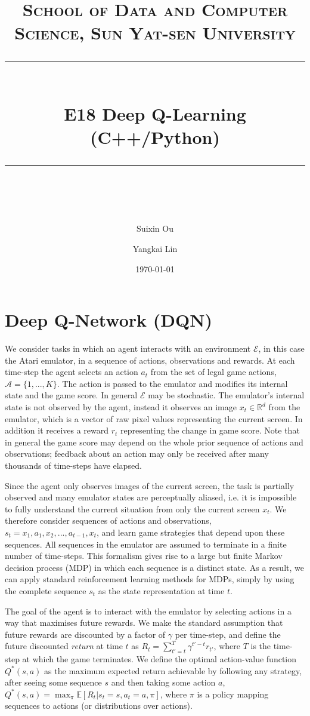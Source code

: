 \documentclass[a4paper, 11pt]{article}
\title{	
\normalfont \normalsize
\textsc{School of Data and Computer Science, Sun Yat-sen University} \\ [25pt] %
\rule{\textwidth}{0.5pt} \\[0.4cm] %
\huge  E18 Deep Q-Learning (C++/Python)\\ %
\rule{\textwidth}{2pt} \\[0.5cm] %
\author{Suixin Ou \and Yangkai Lin}
\date{\normalsize\today}
}
\begin{document}
\maketitle
\tableofcontents
\newpage

\section{Deep Q-Network (DQN) }
We consider tasks in which an agent interacts with an environment $\mathcal{E}$, in this case the Atari emulator, in a sequence of actions, observations and rewards. 
At each time-step the agent selects an action $a_t$ from the set of legal game actions, $\mathcal{A}=\{1, ..., K \}$. The action is passed to the emulator and modifies its internal state and the game score. In general $\mathcal{E}$ may be stochastic. The emulator's internal state is not observed by the agent,  instead it observes an image $x_t\in\mathbb{R}^d$ from the emulator, which is a vector of raw pixel values representing the current screen. In addition it receives a reward $r_t$ representing the change in game score. Note that in general the game score may depend on the whole prior sequence of actions and observations; feedback about an action may only be received after many thousands of time-steps have elapsed. 

Since the agent only observes images of the current screen, the task is partially observed and many emulator states are perceptually aliased, i.e. it is impossible to fully understand the current situation from only the current screen $x_t$. We therefore consider sequences of actions and observations, $s_t = {x_1, a_1, x_2, ..., a_{t-1}, x_t}$, and learn game strategies that depend upon these sequences. All sequences in the emulator are assumed to terminate in a finite number of time-steps. This formalism gives rise to a large but finite Markov decision process (MDP) in which each sequence is a distinct state. As a result, we can apply standard reinforcement learning methods for MDPs, simply by using the complete sequence $s_t$ as the state representation at time $t$.

The goal of the agent is to interact with the emulator by selecting actions in a way that maximises future rewards. We make the standard assumption that future rewards are discounted by a factor of $\gamma$ per time-step, and define the future discounted \emph{return} at time $t$ as $R_t = \sum_{t'=t}^{T} \gamma^{t'-t} r_{t'}$, where $T$
is the time-step at which the game terminates. We define the optimal action-value function $Q^*(s,a)$ as the maximum expected return achievable by following any strategy, after seeing some sequence $s$ and then taking some action $a$, $Q^*(s,a) = \max_{\pi} \mathbb E[R_t | s_t=s, a_t=a, \pi ]$, where $\pi$ is a policy mapping sequences to actions (or distributions over actions).
\end{document}
